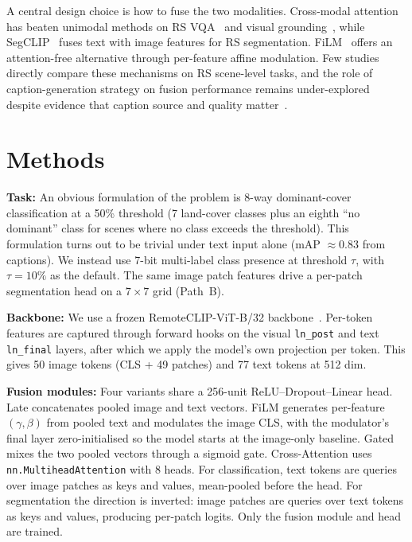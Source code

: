 \documentclass[conference]{IEEEtran}
\begin{document}
A central design choice is how to fuse the two modalities. Cross-modal attention has beaten unimodal methods on RS VQA~\cite{bazi2022bimodal} and visual grounding~\cite{lan2024grounding}, while SegCLIP~\cite{zhang2024segclip} fuses text with image features for RS segmentation. FiLM~\cite{perez2018film} offers an attention-free alternative through per-feature affine modulation. Few studies directly compare these mechanisms on RS scene-level tasks, and the role of caption-generation strategy on fusion performance remains under-explored despite evidence that caption source and quality matter~\cite{chen2024sharegpt4v}.

\section{Methods}

\textbf{Task:} An obvious formulation of the problem is 8-way dominant-cover classification at a 50\% threshold (7 land-cover classes plus an eighth ``no dominant'' class for scenes where no class exceeds the threshold). This formulation turns out to be trivial under text input alone (mAP $\approx 0.83$ from captions). We instead use 7-bit multi-label class presence at threshold $\tau$, with $\tau = 10\%$ as the default. The same image patch features drive a per-patch segmentation head on a $7 \times 7$ grid (Path~B).

\textbf{Backbone:} We use a frozen RemoteCLIP-ViT-B/32 backbone~\cite{liu2024remoteclip}. Per-token features are captured through forward hooks on the visual \texttt{ln\_post} and text \texttt{ln\_final} layers, after which we apply the model's own projection per token. This gives 50 image tokens (CLS + 49 patches) and 77 text tokens at 512 dim.

\textbf{Fusion modules:} Four variants share a 256-unit ReLU--Dropout--Linear head. Late concatenates pooled image and text vectors. FiLM generates per-feature $(\gamma, \beta)$ from pooled text and modulates the image CLS, with the modulator's final layer zero-initialised so the model starts at the image-only baseline. Gated mixes the two pooled vectors through a sigmoid gate. Cross-Attention uses \texttt{nn.MultiheadAttention} with 8 heads. For classification, text tokens are queries over image patches as keys and values, mean-pooled before the head. For segmentation the direction is inverted: image patches are queries over text tokens as keys and values, producing per-patch logits. Only the fusion module and head are trained.
\end{document}

